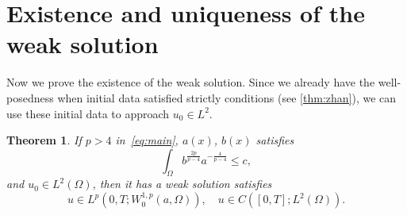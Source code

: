 \documentclass[11pt]{amsart}
\newtheorem{theorem}{Theorem}[section]
\theoremstyle{definition}
\numberwithin{equation}{section}
\begin{document}
\section{Existence and uniqueness of the weak solution}\label{sec:Existence_and_uniqueness_of_the_weak_solution}
Now we prove the existence of the weak solution.
Since we already have the well-posedness when initial data
satisfied strictly conditions (see \cref{thm:zhan}),
we can use these
initial data to approach $u_0 \in L^2$.
\begin{theorem}\label{thm:absorb}
If $p>4$ in~\cref{eq:main}, $a(x)$, $b(x)$ satisfies
\begin{equation}
	\int_{\Omega} b^{\frac{2p}{p-4}}a^{-\frac{4}{p-4}} \leq c,
\end{equation}
and $u_0 \in L^2(\Omega) $, then it has a weak solution satisfies
\begin{equation}
u \in L^p(0, T; W_0^{1,p}(a,\Omega)), \quad u \in C([0, T]; L^2(\Omega)).
\end{equation}
\end{theorem}
\end{document}
